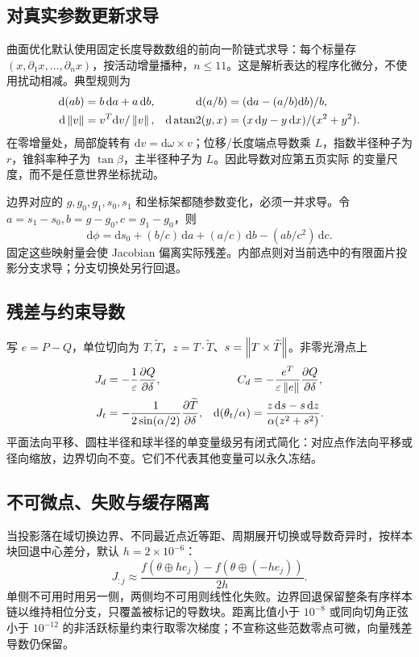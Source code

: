 \subsection{对真实参数更新求导}
曲面优化默认使用固定长度导数数组的前向一阶链式求导：每个标量存 $(x,\partial_1x,\ldots,\partial_nx)$，按活动增量播种，$n\le11$。这是解析表达的程序化微分，不使用扰动相减。典型规则为
\begin{align}
 \mathrm d(ab)&=b\,\mathrm da+a\,\mathrm db,&
 \mathrm d(a/b)&=(\mathrm da-(a/b)\mathrm db)/b,\\
 \mathrm d\left\lVert v\right\rVert&=v^T\mathrm dv/\left\lVert v\right\rVert,&
 \mathrm d\operatorname{atan2}(y,x)&=(x\,\mathrm dy-y\,\mathrm dx)/(x^2+y^2).
\end{align}
在零增量处，局部旋转有 $\mathrm dv=\mathrm d\omega\times v$；位移/长度端点导数乘 $L$，指数半径种子为 $r$，锥斜率种子为 $\tan\beta$，主半径种子为 $L$。因此导数对应第五页实际  的变量尺度，而不是任意世界坐标扰动。

边界对应的 $g,g_0,g_1,s_0,s_1$ 和坐标架都随参数变化，必须一并求导。令 $a=s_1-s_0,b=g-g_0,c=g_1-g_0$，则
\begin{equation}
 \mathrm d\phi=\mathrm ds_0+(b/c)\,\mathrm da+(a/c)\,\mathrm db-(ab/c^2)\,\mathrm dc.
\end{equation}
固定这些映射量会使 Jacobian 偏离实际残差。内部点则对当前选中的有限面片投影分支求导；分支切换处另行回退。

\subsection{残差与约束导数}
写 $e=P-Q$，单位切向为 $T,\widetilde T$，$z=T\cdot\widetilde T$、$s=\left\lVert T\times\widetilde T\right\rVert$。非零光滑点上
\begin{align}
 J_d&=-\frac1{\varepsilon}\frac{\partial Q}{\partial\delta},&
 C_d&=-\frac{e^T}{\varepsilon\left\lVert e\right\rVert}\frac{\partial Q}{\partial\delta},\\
 J_t&=-\frac1{2\sin(\alpha/2)}\frac{\partial\widetilde T}{\partial\delta},&
 \mathrm d(\theta_t/\alpha)&=\frac{z\,\mathrm ds-s\,\mathrm dz}{\alpha(z^2+s^2)}.
\end{align}
平面法向平移、圆柱半径和球半径的单变量级另有闭式简化：对应点作法向平移或径向缩放，边界切向不变。它们不代表其他变量可以永久冻结。

\subsection{不可微点、失败与缓存隔离}
当投影落在域切换边界、不同最近点近等距、周期展开切换或导数奇异时，按样本块回退中心差分，默认 $h=2\times10^{-6}$：
\begin{equation}
 J_{:j}\approx\frac{f(\theta\oplus h e_j)-f(\theta\oplus(-h e_j))}{2h}.
\end{equation}
单侧不可用时用另一侧，两侧均不可用则线性化失败。边界回退保留整条有序样本链以维持相位分支，只覆盖被标记的导数块。距离比值小于 $10^{-8}$ 或同向切角正弦小于 $10^{-12}$ 的非活跃标量约束行取零次梯度；不宣称这些范数零点可微，向量残差导数仍保留。

